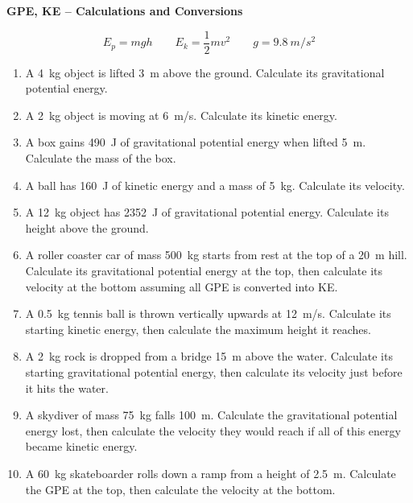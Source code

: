 \documentclass[12pt]{article}
\begin{document}
\begin{center}
    \Large \textbf{GPE, KE -- Calculations and Conversions}
\end{center}

\[
E_p = mgh \quad\quad E_k = \frac{1}{2}mv^2 \quad\quad g = \SI{9.8}{m/s^2}
\]

\begin{enumerate}

\item A \SI{4}{kg} object is lifted \SI{3}{m} above the ground. Calculate its gravitational potential energy.

\item A \SI{2}{kg} object is moving at \SI{6}{m/s}. Calculate its kinetic energy.

\item A box gains \SI{490}{J} of gravitational potential energy when lifted \SI{5}{m}. Calculate the mass of the box.

\item A ball has \SI{160}{J} of kinetic energy and a mass of \SI{5}{kg}. Calculate its velocity.

\item A \SI{12}{kg} object has \SI{2352}{J} of gravitational potential energy. Calculate its height above the ground.

\item A roller coaster car of mass \SI{500}{kg} starts from rest at the top of a \SI{20}{m} hill. Calculate its gravitational potential energy at the top, then calculate its velocity at the bottom assuming all GPE is converted into KE.

\item A \SI{0.5}{kg} tennis ball is thrown vertically upwards at \SI{12}{m/s}. Calculate its starting kinetic energy, then calculate the maximum height it reaches.

\item A \SI{2}{kg} rock is dropped from a bridge \SI{15}{m} above the water. Calculate its starting gravitational potential energy, then calculate its velocity just before it hits the water.

\item A skydiver of mass \SI{75}{kg} falls \SI{100}{m}. Calculate the gravitational potential energy lost, then calculate the velocity they would reach if all of this energy became kinetic energy.

\item A \SI{60}{kg} skateboarder rolls down a ramp from a height of \SI{2.5}{m}. Calculate the GPE at the top, then calculate the velocity at the bottom.


\end{enumerate}
\end{document}
